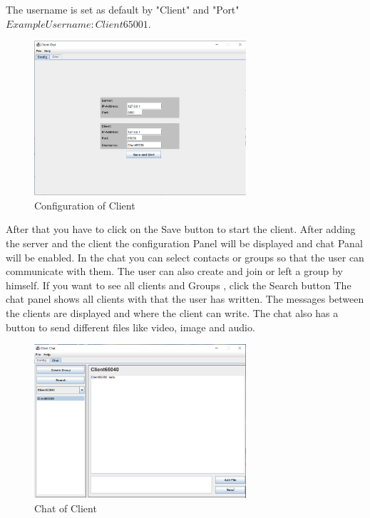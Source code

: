 \noindent
The username is set as default by "Client" and "Port" \( Example Username : Client65001\).
\begin{figure}[htb!]
    \centering
    \includegraphics[width=0.7\textwidth]{gfx/Client_Config}
    \caption{Configuration of Client}
    \label{fig:Client-config}
\end{figure}
\noindent
After that you have to click on the Save button to start the client.
After adding the server and the client the configuration Panel will be displayed and chat Panal
will be enabled.
In the chat you can select contacts or groups so that the user can communicate with them.
The user can also create and join or left a group by himself.
If you want to see all clients and Groups , click the Search button
The chat panel shows all clients with that the user has written.
The messages between the clients are displayed and where the client can write.
The chat also has a button to send different files like video, image and audio.
\begin{figure}[htb!]
    \centering
    \includegraphics[width=0.7\textwidth]{gfx/Client_Chat}
    \caption{Chat of Client}
    \label{fig:Client-Chat}
\end{figure}

